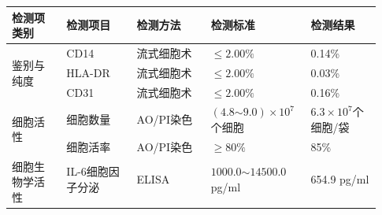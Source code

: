 \documentclass[UTF8,10pt,a4paper,fontset=fandol]{ctexart}
\newcommand{\fieldvalue}[1]{#1}
\begin{document}
\small
\begin{tabular}{|p{0.14\linewidth}|p{0.18\linewidth}|p{0.19\linewidth}|p{0.24\linewidth}|p{0.18\linewidth}|}
\hline
检测项类别 & 检测项目 & 检测方法 & 检测标准 & 检测结果
\\ \hline
\multirow{3}{*}{鉴别与纯度}
&
\fieldvalue{CD14}
&
\fieldvalue{流式细胞术}
&
\fieldvalue{$\leq 2.00\%$}
&
\fieldvalue{0.14\%}
\\ \cline{2-5}
&
\fieldvalue{HLA-DR}
&
\fieldvalue{流式细胞术}
&
\fieldvalue{$\leq 2.00\%$}
&
\fieldvalue{0.03\%}
\\ \cline{2-5}
&
\fieldvalue{CD31}
&
\fieldvalue{流式细胞术}
&
\fieldvalue{$\leq 2.00\%$}
&
\fieldvalue{0.16\%}
\\ \hline
\multirow{2}{*}{细胞活性}
&
\fieldvalue{细胞数量}
&
\fieldvalue{AO/PI染色}
&
\fieldvalue{$(4.8\mathord{\sim}9.0)\times10^7$个细胞}
&
\fieldvalue{$6.3\times10^7$个细胞/袋}
\\ \cline{2-5}
&
\fieldvalue{细胞活率}
&
\fieldvalue{AO/PI染色}
&
\fieldvalue{$\geq 80\%$}
&
\fieldvalue{85\%}
\\ \hline
\multirow{3}{*}{细胞生物学活性}
&
\fieldvalue{IL-6细胞因子分泌}
&
\fieldvalue{ELISA}
&
\fieldvalue{$1000.0\mathord{\sim}14500.0$ pg/ml}
&
\fieldvalue{654.9 pg/ml}
\\ \cline{2-5}

\end{tabular}
\end{document}
